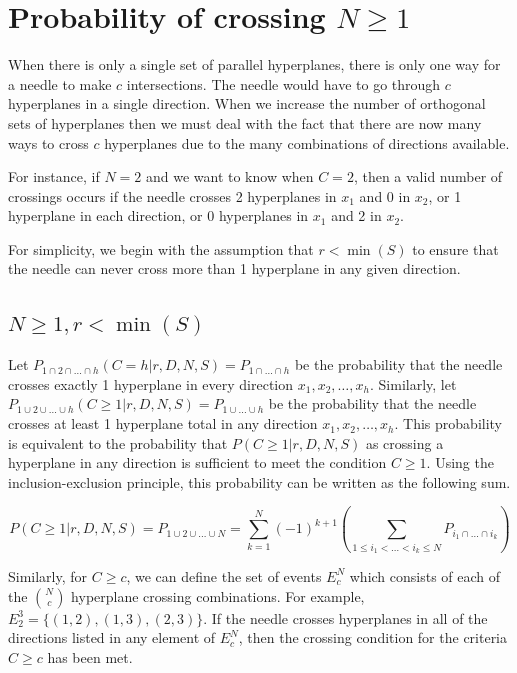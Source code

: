 \documentclass{article}
\begin{document}
\section{Probability of crossing $N\ge 1$}
When there is only a single set of parallel hyperplanes, there is only one way for a needle to make
$c$ intersections. The needle would have to go through $c$ hyperplanes in a single direction.
When we increase the number of orthogonal sets of hyperplanes then we must deal with the fact that
there are now many ways to cross $c$ hyperplanes due to the many combinations of directions available.

For instance, if $N=2$ and we want to know when $C=2$, then a valid number of crossings occurs if the
needle crosses 2 hyperplanes in $x_1$ and 0 in $x_2$, or 1 hyperplane in each direction, or 0 hyperplanes
in $x_1$ and 2 in $x_2$.

For simplicity, we begin with the assumption that $r<\min(S)$ to ensure that the needle can never cross
more than 1 hyperplane in any given direction.

\subsection{$N\ge 1, r<\min(S)$}
Let $P_{1\cap2\cap\hdots\cap h}(C=h|r,D,N,S)=P_{1\cap\hdots\cap h}$ be the probability that the
needle crosses exactly 1 hyperplane in every direction $x_1, x_2, \hdots, x_h$. Similarly,
let $P_{1\cup2\cup\hdots\cup h}(C\ge 1|r,D,N,S)=P_{1\cup\hdots\cup h}$ be the probability that
the needle crosses at least 1 hyperplane total in any direction $x_1, x_2, \hdots, x_h$. This probability
is equivalent to the probability that $P(C\ge 1|r,D,N,S)$ as crossing a hyperplane in any 
direction is sufficient to meet the condition $C\ge 1$. Using the inclusion-exclusion principle,
this probability can be written as the following sum.

\begin{equation}
	P(C\ge 1|r, D, N, S) = P_{1\cup2\cup\hdots\cup N} = \sum_{k=1}^N (-1)^{k+1}\left(\sum_{1\le i_1 < \hdots < i_k \le N}P_{i_1 \cap \hdots \cap i_k} \right)
\end{equation}

Similarly, for $C\ge c$, we can define the set of events $E_c^N$ which consists of each of the
$N \choose c$ hyperplane crossing combinations. For example, $E_2^3=\{(1,2), (1,3), (2,3)\}$.
If the needle crosses hyperplanes in all of the directions listed in any element of $E_c^N$,
then the crossing condition for the criteria $C \ge c$ has been met.
\end{document}
